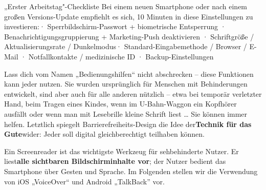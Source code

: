 \begin{tcbinfo}{„Erster Arbeitstag"-Checkliste}
Bei einem neuen Smartphone oder nach einem großen Versions-Update empfiehlt es sich, 10 Minuten in diese Einstellungen zu investieren:\newline · Sperrbildschirm-Passwort + biometrische Entsperrung · Benachrichtigungsgruppierung + Marketing-Push deaktivieren · Schriftgröße / Aktualisierungsrate / Dunkelmodus\newline · Standard-Eingabemethode / Browser / E-Mail · Notfallkontakte / medizinische ID · Backup-Einstellungen

\end{tcbinfo}


Lass dich vom Namen „Bedienungshilfen“ nicht abschrecken – diese Funktionen kann jeder nutzen. Sie wurden ursprünglich für Menschen mit Behinderungen entwickelt, sind aber auch für alle anderen nützlich – etwa bei temporär verletzter Hand, beim Tragen eines Kindes, wenn im U-Bahn-Waggon ein Kopfhörer ausfällt oder wenn man mit Lesebrille kleine Schrift liest … Sie können immer helfen. Letztlich spiegelt Barrierefreiheits-Design die Idee der\textbf{Technik für das Gute}wider: Jeder soll digital gleichberechtigt teilhaben können.


Ein Screenreader ist das wichtigste Werkzeug für sehbehinderte Nutzer. Er liest\textbf{alle sichtbaren Bildschirminhalte vor}; der Nutzer bedient das Smartphone über Gesten und Sprache. Im Folgenden stellen wir die Verwendung von iOS „VoiceOver“ und Android „TalkBack” vor.

